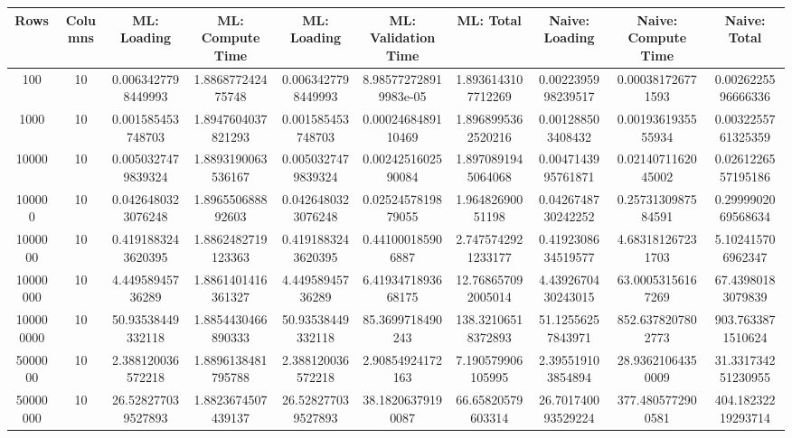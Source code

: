 \begin{table}[htb]
    \centering
    \begin{tabular}{@{}cccccccccc@{}}
        \toprule
        Rows & Columns & ML: Loading & ML: Compute Time & ML: Loading & ML: Validation Time & ML: Total & Naive: Loading & Naive: Compute Time & Naive: Total \\
        \midrule
        100 & 10 & 0.0063427798449993 & 1.886877242475748 & 0.0063427798449993 & 8.985772728919983e-05 & 1.8936143107712269 & 0.0022395998239517 & 0.000381726771593 & 0.0026225596666336 \\
        1000 & 10 & 0.001585453748703 & 1.8947604037821293 & 0.001585453748703 & 0.0002468489110469 & 1.8968995362520216 & 0.001288503408432 & 0.0019361935555934 & 0.0032255761325359 \\
        10000 & 10 & 0.0050327479839324 & 1.8893190063536167 & 0.0050327479839324 & 0.0024251602590084 & 1.8970891945064068 & 0.0047143995761871 & 0.0214071162045002 & 0.0261226557195186 \\
        100000 & 10 & 0.0426480323076248 & 1.896550688892603 & 0.0426480323076248 & 0.0252457819879055 & 1.96482690051198 & 0.0426748730242252 & 0.2573130987584591 & 0.2999902069568634 \\
        1000000 & 10 & 0.4191883243620395 & 1.8862482719123363 & 0.4191883243620395 & 0.441000185906887 & 2.7475742921233177 & 0.4192308634519577 & 4.683181267231703 & 5.102415706962347 \\
        10000000 & 10 & 4.44958945736289 & 1.8861401416361327 & 4.44958945736289 & 6.4193471893668175 & 12.768657092005014 & 4.4392670430243015 & 63.00053156167269 & 67.43980183079839 \\
        100000000 & 10 & 50.93538449332118 & 1.8854430466890333 & 50.93538449332118 & 85.3699718490243 & 138.32106518372893 & 51.12556257843971 & 852.6378207802773 & 903.7633871510624 \\
        5000000 & 10 & 2.388120036572218 & 1.8896138481795788 & 2.388120036572218 & 2.90854924172163 & 7.190579906105995 & 2.395519103854894 & 28.93621064350009 & 31.331734251230955 \\
        50000000 & 10 & 26.528277039527893 & 1.8823674507439137 & 26.528277039527893 & 38.18206379190087 & 66.65820579603314 & 26.701740093529224 & 377.4805772900581 & 404.18232219293714 \\
        \bottomrule
    \end{tabular}
\end{table}